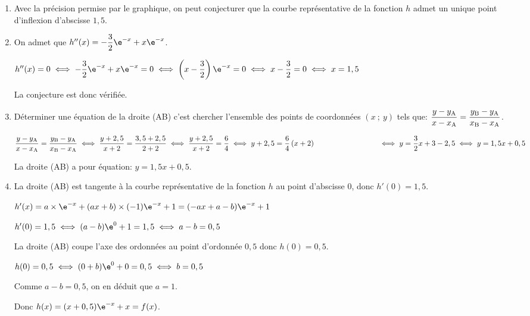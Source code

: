 \begin{enumerate}
\item Avec la précision permise par le graphique, on peut conjecturer que la courbe représentative de la fonction $h$ admet un unique point d'inflexion d'abscisse  $1,5$.

\item On admet que $h''(x) = - \dfrac32 \e^{- x} + x\e^{- x}$.

$h''(x)=0
\iff
-\dfrac{3}{2}\e^{-x}+x\e^{-x}=0
\iff
\left (x-\dfrac{3}{2}\right )\e^{-x}=0
\iff
x-\dfrac{3}{2}=0
\iff
x=1,5$

La conjecture est donc vérifiée.

\item Déterminer une équation de la droite (AB) c'est chercher l'ensemble des points de coordonnées $(x~;~y)$ tels que:
$\dfrac{y-y_{\text A}}{x-x_{\text A}} = \dfrac{y_{\text B}-y_{\text A}}{x_{\text B}-x_{\text A}}$.

$\dfrac{y-y_{\text A}}{x-x_{\text A}} = \dfrac{y_{\text B}-y_{\text A}}{x_{\text B}-x_{\text A}}
\iff
\dfrac{y+2,5}{x+2} = \dfrac{3,5 + 2,5}{2 + 2}
\iff
\dfrac{y+2,5}{x+2} = \dfrac{6}{4}
\iff
y+2,5 = \dfrac{6}{4}\left (x+2\right )\\
\phantom{\dfrac{y-y_{\text A}}{x-x_{\text A}} = \dfrac{y_{\text B}-y_{\text A}}{x_{\text B}-x_{\text A}}}
\iff
y=\dfrac{3}{2}x +3-2,5
\iff
y=1,5x + 0,5$

La droite (AB) a pour équation: $y =1,5x + 0,5$.

\item La droite (AB) est tangente à la courbe représentative de la fonction $h$ au point d'abscisse 0, donc $h'(0)=1,5$.

$h'(x)=a\times \e^{-x} +  (ax+b)\times (-1)\e^{-x}+1
=  (-ax+a-b )\e^{-x}+1$

$h'(0)=1,5
\iff
(a-b)\e^{0}+1=1,5
\iff
a-b=0,5$

La droite (AB) coupe l'axe des ordonnées au point d'ordonnée $0,5$ donc $h(0)=0,5$.

$h(0)=0,5
\iff
(0+b)\e^{0}+0=0,5
\iff
b=0,5$

Comme $a-b=0,5$, on en déduit que $a=1$.

Donc $h(x)=(x+0,5)\e^{-x}+x=f(x)$.
\end{enumerate}

\bigskip

